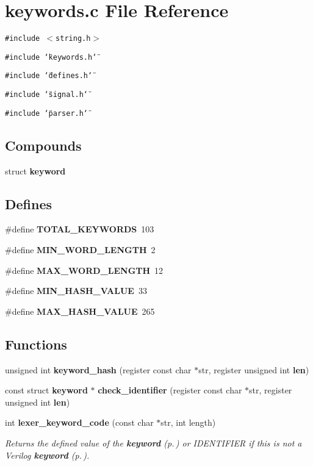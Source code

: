\section{keywords.c File Reference}
\label{keywords_8c}
{\tt \#include $<$string.h$>$}\par
{\tt \#include \char`\"{}keywords.h\char`\"{}}\par
{\tt \#include \char`\"{}defines.h\char`\"{}}\par
{\tt \#include \char`\"{}signal.h\char`\"{}}\par
{\tt \#include \char`\"{}parser.h\char`\"{}}\par
\subsection*{Compounds}
\begin{CompactItemize}
\item 
struct {\bf keyword}
\end{CompactItemize}
\subsection*{Defines}
\begin{CompactItemize}
\item 
\#define {\bf TOTAL\_\-KEYWORDS}\ 103
\item 
\#define {\bf MIN\_\-WORD\_\-LENGTH}\ 2
\item 
\#define {\bf MAX\_\-WORD\_\-LENGTH}\ 12
\item 
\#define {\bf MIN\_\-HASH\_\-VALUE}\ 33
\item 
\#define {\bf MAX\_\-HASH\_\-VALUE}\ 265
\end{CompactItemize}
\subsection*{Functions}
\begin{CompactItemize}
\item 
unsigned int {\bf keyword\_\-hash} (register const char $\ast$str, register unsigned int {\bf len})
\item 
const struct {\bf keyword} $\ast$ {\bf check\_\-identifier} (register const char $\ast$str, register unsigned int {\bf len})
\item 
int {\bf lexer\_\-keyword\_\-code} (const char $\ast$str, int length)
\begin{CompactList}\small\item\em Returns the defined value of the {\bf keyword} {\rm (p.\,\pageref{structkeyword})} or IDENTIFIER if this is not a Verilog {\bf keyword} {\rm (p.\,\pageref{structkeyword})}.\item\end{CompactList}\end{CompactItemize}


